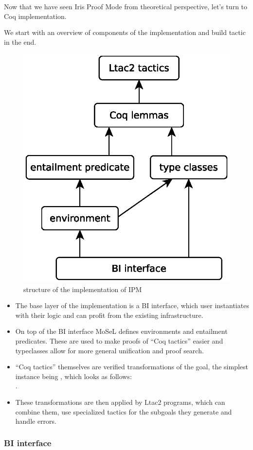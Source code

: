 Now that we have seen Iris Proof Mode from theoretical perspective, let's turn to Coq implementation.

We start with an overview of components of the implementation and build  tactic in the end.

\begin{figure}[H]
  \includegraphics[width=0.5\linewidth]{ipm-diagram}
  \caption{structure of the implementation of IPM}
  \label{fig:ipm-diagram}
\end{figure}


\begin{itemize}
\item The base layer of the implementation is a BI interface, which user instantiates with their logic and can profit from the existing infrastructure.
\item On top of the BI interface MoSeL defines environments and entailment predicates. These are used to make proofs of ``Coq tactics'' easier and typeclasses allow for more general unification and proof search.
\item ``Coq tactics'' themselves are verified transformations of the goal, the simplest instance being , which looks as follows:\\
.
\item These transformations are then applied by Ltac2 programs, which can combine them, use specialized tactics for the subgoals they generate and handle errors.
\end{itemize}


\subsubsection{BI interface}
\label{subsubsec:bi-interface}

